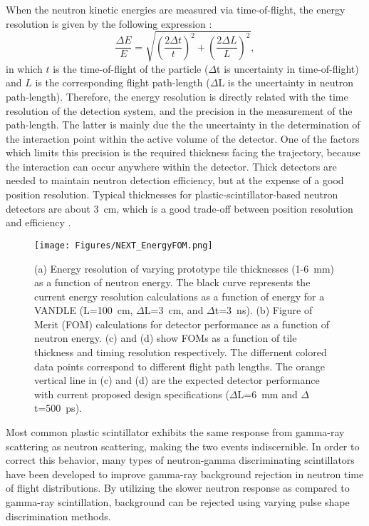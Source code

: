 \documentclass[preprint,3p,twocolumn]{elsarticle}
\begin{document}
When the neutron kinetic energies are measured via time-of-flight, the energy resolution is given by the following expression \cite{KORNILOV2009226}:
\begin{equation}
\frac{\Delta E}{E}=\sqrt{\left(\frac{2\Delta t}{t}\right )^2+\left(\frac{2\Delta L}{L}\right )^2},
\label{eq:resolution}
\end{equation}
in which $t$  is the time-of-flight of the particle ($\Delta$t is uncertainty in time-of-flight) and $L$ is the corresponding flight path-length ($\Delta$L is the uncertainty in neutron path-length). Therefore, the energy resolution is directly related with the time resolution of the detection system, and the precision in the measurement of the path-length. The latter is mainly due the the uncertainty in the determination of the interaction point within the active volume of the detector. One of the factors which limits this precision is the required thickness facing the trajectory, because the interaction can occur anywhere within the detector. Thick detectors are needed to maintain neutron detection efficiency, but at the expense of a good position resolution. Typical thicknesses for plastic-scintillator-based neutron detectors are about 3~cm, which is a good trade-off between position resolution and efficiency \cite{PETERS2016122,BUTA2000412,MORRISSEY1997222}.
\begin{figure}[tp]
\centering
\texttt{[image: Figures/NEXT\_EnergyFOM.png]}
\caption{(a) Energy resolution of varying prototype tile thicknesses (1-6~mm) as a function of neutron energy. The black curve represents the current energy resolution calculations as a function of energy for a VANDLE (L=100~cm, $\Delta$L=3~cm, and $\Delta$t=3~ns). (b) Figure of Merit (FOM) calculations for detector performance as a function of neutron energy. (c) and (d) show FOMs as a function of tile thickness and timing resolution respectively. The differnent colored data points correspond to different flight path lengths. The orange vertical line in (c) and (d) are the expected detector performance with current proposed design specifications ($\Delta$L=6~mm and $\Delta$t=500~ps).}
\label{fig:resolution}
\end{figure}


Most common plastic scintillator exhibits the same response from gamma-ray scattering as neutron scattering, making the two events indiscernible. In order to correct this behavior, many types of neutron-gamma discriminating scintillators have been developed to improve gamma-ray background rejection in neutron time of flight distributions. By utilizing the slower neutron response as compared to gamma-ray scintillation, background can be rejected using varying pulse shape discrimination methods.
\end{document}
